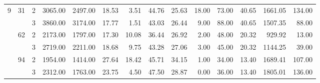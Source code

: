 \begin{tabular}{lllrrrrrrrrrrr}
\cline{2-14}
\multirow{6}{*}{9} & \multirow{2}{*}{31} & 2 &  3065.00 &   2497.00 & 18.53 &    3.51 &   44.76 &   25.63 &   18.00 &   73.00 &   40.65 & 1661.05 &   134.00 \\
  &    & 3 &  3860.00 &   3174.00 & 17.77 &    1.51 &   43.03 &   26.44 &    9.00 &   88.00 &   40.65 & 1507.35 &    88.00 \\
\cline{2-14}
  & \multirow{2}{*}{62} & 2 &  2173.00 &   1797.00 & 17.30 &   10.08 &   36.44 &   26.92 &    2.00 &   48.00 &   20.32 &  929.92 &    13.00 \\
  &    & 3 &  2719.00 &   2211.00 & 18.68 &    9.75 &   43.28 &   27.06 &    3.00 &   45.00 &   20.32 & 1144.25 &    39.00 \\
\cline{2-14}
  & \multirow{2}{*}{94} & 2 &  1954.00 &   1414.00 & 27.64 &   18.42 &   45.71 &   34.15 &    1.00 &   34.00 &   13.40 & 1689.41 &   107.00 \\
  &    & 3 &  2312.00 &   1763.00 & 23.75 &    4.50 &   47.50 &   28.87 &    0.00 &   36.00 &   13.40 & 1805.01 &   136.00 \\
\bottomrule
\end{tabular}
